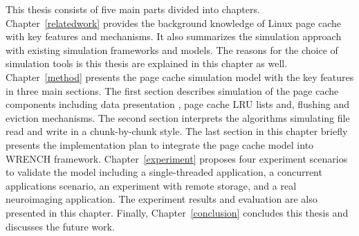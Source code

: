 This thesis consists of five main parts divided into chapters.
Chapter~\ref{relatedwork} provides the background knowledge of Linux page cache 
with key features and mechanisms. 
It also summarizes the simulation approach  with 
existing simulation frameworks and models. 
The reasons for the choice of simulation tools is this thesis are explained in this 
chapter as well.
Chapter~\ref{method} presents the page cache simulation model with the key features 
in three main sections.
The first section describes simulation of the page cache components including data 
presentation , page cache LRU lists and, flushing and eviction mechanisms.
The second section interprets the algorithms simulating file read and write 
in a chunk-by-chunk style.
The last section in this chapter briefly presents the implementation plan to integrate 
the page cache model into WRENCH framework.
Chapter~\ref{experiment} proposes four experiment scenarios to validate the model
including a single-threaded application, a concurrent applications scenario, 
an experiment with remote storage, and a real neuroimaging application. 
The experiment results and evaluation are also presented in this chapter. 
Finally, Chapter~\ref{conclusion} concludes this thesis and discusses the future work. 


